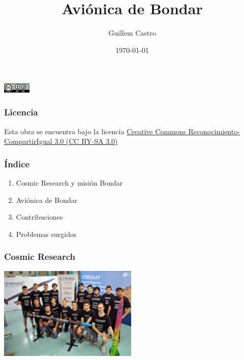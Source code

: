 \documentclass[numfooter]{beamer}
\begin{document}
    
    \title{Aviónica de Bondar}
    \author{Guillem Castro}
    \date{\today}

    \begin{frame}
        \maketitle
        \centering
        \includegraphics[width=50px]{images/ccbysa.png}
    \end{frame}

    \begin{frame}
        \frametitle{Licencia}
        Esta obra se encuentra bajo la licencia \href{https://creativecommons.org/licenses/by-sa/3.0/es/}{Creative Commons Reconocimiento-CompartirIgual 3.0 (CC BY-SA 3.0)}

    \end{frame}
    
    \begin{frame}
        \frametitle{Índice}
        \begin{enumerate}
            \item Cosmic Research y misión Bondar
            \item Aviónica de Bondar
            \item Contribuciones
            \item Problemas surgidos
        \end{enumerate}
    \end{frame}
    
    \begin{frame}
        \frametitle{Cosmic Research}
        \centering
        \includegraphics[width=250px]{images/cr.jpg}
    \end{frame}
    
\end{document}
